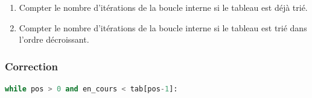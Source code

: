 \documentclass[svgnames,11pt]{beamer}
\begin{document}
\begin{frame}
    \frametitle{}

    \begin{activite}
        \begin{enumerate}
            \item Compter le nombre d'itérations de la boucle interne si le tableau est déjà trié.
            \item Compter le nombre d'itérations de la boucle interne si le tableau est trié dans l'ordre décroissant.
        \end{enumerate}
    \end{activite}

\end{frame}

\begin{frame}[fragile]
    \frametitle{Correction}

    \begin{center}
        \begin{lstlisting}[language=Python, basicstyle=\small, xrightmargin=1em]
while pos > 0 and en_cours < tab[pos-1]:
\end{lstlisting}
        \end{center}
    \begin{center}
        \label{CODE}
        \end{center}

\end{frame}
\end{document}
